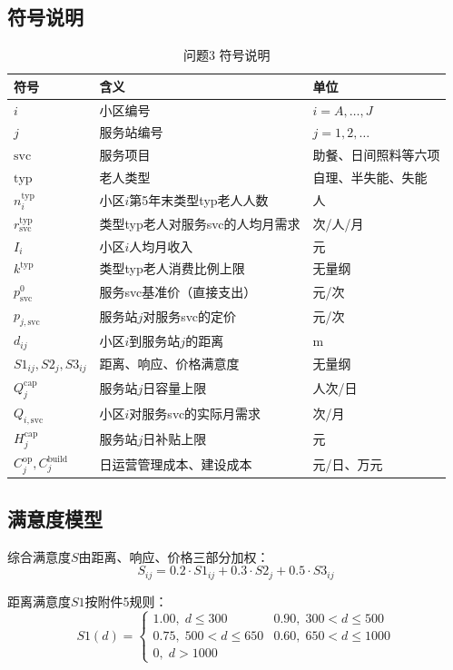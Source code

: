 \documentclass[12pt,a4paper]{article}
\begin{document}
\subsection{符号说明}
\begin{table}[htbp]
\centering
\caption{问题3 符号说明}
\begin{tabular}{@{}lll@{}}
\toprule
符号 & 含义 & 单位 \\
\midrule
$i$ & 小区编号 & $i=A,\ldots,J$ \\
$j$ & 服务站编号 & $j=1,2,\ldots$ \\
$\text{svc}$ & 服务项目 & 助餐、日间照料等六项 \\
$\text{typ}$ & 老人类型 & 自理、半失能、失能 \\
$n_i^{\text{typ}}$ & 小区$i$第5年末类型typ老人人数 & 人 \\
$r_{\text{svc}}^{\text{typ}}$ & 类型typ老人对服务svc的人均月需求 & 次/人/月 \\
$I_i$ & 小区$i$人均月收入 & 元 \\
$k^{\text{typ}}$ & 类型typ老人消费比例上限 & 无量纲 \\
$p_{\text{svc}}^0$ & 服务svc基准价（直接支出） & 元/次 \\
$p_{j,\text{svc}}$ & 服务站$j$对服务svc的定价 & 元/次 \\
$d_{ij}$ & 小区$i$到服务站$j$的距离 & m \\
$S1_{ij},S2_j,S3_{ij}$ & 距离、响应、价格满意度 & 无量纲 \\
$Q_j^{\text{cap}}$ & 服务站$j$日容量上限 & 人次/日 \\
$Q_{i,\text{svc}}$ & 小区$i$对服务svc的实际月需求 & 次/月 \\
$H_j^{\text{cap}}$ & 服务站$j$日补贴上限 & 元 \\
$C_j^{\text{op}}, C_j^{\text{build}}$ & 日运营管理成本、建设成本 & 元/日、万元 \\
\bottomrule
\end{tabular}
\end{table}

\subsection{满意度模型}
综合满意度$S$由距离、响应、价格三部分加权：
\begin{equation}
S_{ij} = 0.2\cdot S1_{ij} + 0.3\cdot S2_j + 0.5\cdot S3_{ij}
\label{eq:S}
\end{equation}

距离满意度$S1$按附件5规则：
\begin{equation}
S1(d)=
\begin{cases}
1.00,\;d\leq300 & 0.90,\;300<d\leq500 \\
0.75,\;500<d\leq650 & 0.60,\;650<d\leq1000 \\
0,\;d>1000 &
\end{cases}
\label{eq:S1}
\end{equation}
\end{document}

